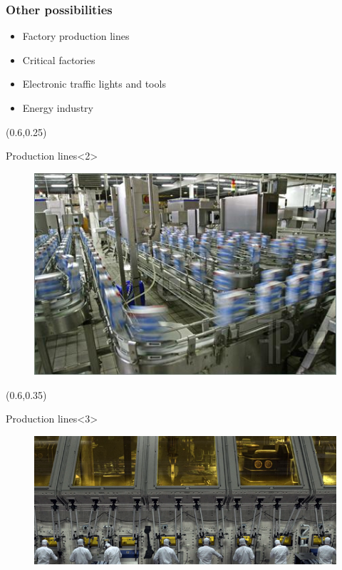 \documentclass{beamer}
\begin{document}
\begin{frame}
\frametitle{Other possibilities}
    \begin{itemize}
        \item<2-> Factory production lines
        \item<3-> Critical factories
        \item<4-|alert@4-7> Electronic traffic lights and tools
        \item<8-|alert@8> Energy industry
    \end{itemize}
    \begin{textblock*}{50mm}(0.6\textwidth,0.25\textheight)
        \begin{exampleblock}{Production lines}<2>
            \begin{figure}
                \includegraphics[width=\textwidth]{imgs/aux/Production-Line-Factory.jpg}
            \end{figure}
        \end{exampleblock}
    \end{textblock*}
    \begin{textblock*}{50mm}(0.6\textwidth,0.35\textheight)
        \begin{exampleblock}{Production lines}<3>
            \begin{figure}
                \includegraphics[width=\textwidth]{imgs/aux/THX_1138_DC.png}

\end{figure}
\end{exampleblock}
\end{textblock*}
\end{frame}
\end{document}
